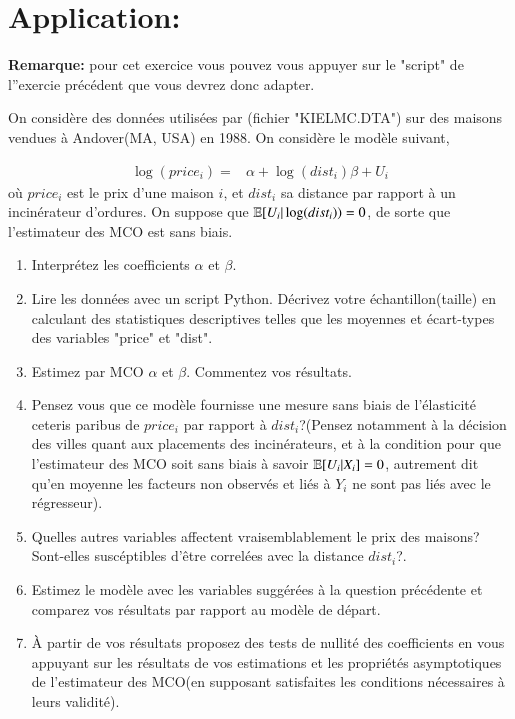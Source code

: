 \documentclass[10pt, reqno]{amsart}
\begin{document}
\section{Application: \cite{KielMcCain1995}}
\textbf{Remarque:} pour cet exercice vous pouvez vous appuyer sur le "script" de l''exercie précédent que vous devrez donc adapter.

\medskip

On considère des données utilisées par \cite{KielMcCain1995}(fichier "KIELMC.DTA") sur des maisons vendues à Andover(MA, USA) en 1988. On considère le modèle suivant,

\begin{align*}
\log(price_i) =& \alpha + \log(dist_i)\beta + U_i
\end{align*}
où $price_i$ est le prix d'une maison $i$, et $dist_i$ sa distance par rapport à un incinérateur d'ordures. On suppose que $\mathbb{E}[U_i| \log(dist_i)) = 0$, de sorte que l'estimateur des MCO est sans biais.

 \begin{enumerate}
 \item Interprétez les coefficients $\alpha$ et $\beta$. 
\item Lire les données avec un script Python. Décrivez votre
  échantillon(taille) en calculant des statistiques descriptives
  telles que les moyennes et
  écart-types des variables "price" et "dist".
 \item Estimez par MCO $\alpha$ et $\beta$. Commentez vos résultats.
 \item Pensez vous que ce modèle fournisse une mesure sans biais de l'élasticité ceteris paribus de $price_i$ par rapport à $dist_i$?(Pensez  notamment à la décision des villes quant aux placements des incinérateurs, et à la condition pour que l'estimateur des MCO soit sans biais à savoir $\mathbb{E}[U_i|X_i] = 0$, autrement dit qu'en moyenne les facteurs non observés et liés à $Y_i$ ne sont pas liés avec le régresseur).
 \item Quelles autres variables affectent vraisemblablement le prix des
   maisons? Sont-elles suscéptibles d'être correlées avec la distance
   $dist_i$?.
  \item Estimez le modèle avec les variables suggérées à la question précédente et comparez vos résultats 
  par rapport au modèle de départ. 
  \item À partir de vos résultats proposez des tests de nullité des coefficients en vous appuyant sur 
  les résultats de vos estimations et les propriétés asymptotiques de l'estimateur des MCO(en supposant 
  satisfaites les conditions nécessaires à leurs validité).
 \end{enumerate}



 
\end{document}
